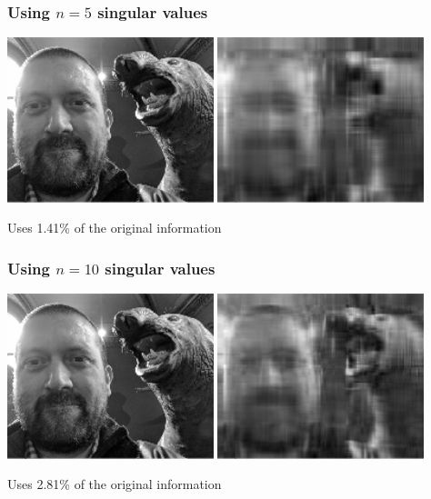 \documentclass[aspectratio=169]{beamer}\usepackage[]{graphicx}\usepackage[]{xcolor}
\begin{document}
\begin{frame}\frametitle{Using $n=5$ singular values}
\begin{center}
\includegraphics[width=0.45\textwidth]{FIGS/L08-plot-image-svd-original-1.png}
\includegraphics[width=0.45\textwidth]{FIGS/L08-plot-image-svd-n5-1.png}
\end{center}
\vfill
Uses 1.41\% of the original information
\end{frame}




\begin{frame}\frametitle{Using $n=10$ singular values}
\begin{center}
\includegraphics[width=0.45\textwidth]{FIGS/L08-plot-image-svd-original-1.png}
\includegraphics[width=0.45\textwidth]{FIGS/L08-plot-image-svd-n10-1.png}
\end{center}
\vfill
Uses 2.81\% of the original information
\end{frame}
\end{document}
